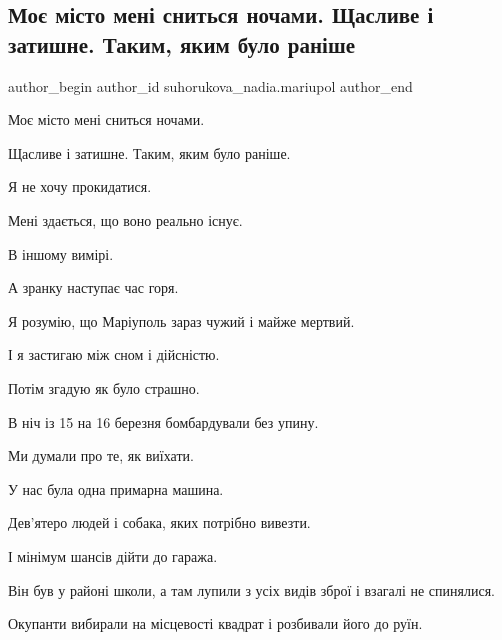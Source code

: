  
 
 
 
 

\subsection{Моє місто мені сниться ночами. Щасливе і затишне. Таким, яким  було раніше}
\label{sec:05_02_2023.fb.suhorukova_nadia.mariupol.1.mo__m_sto_men__snits}

\ifcmt
 author_begin
   author_id suhorukova_nadia.mariupol
 author_end
\fi

Моє місто мені сниться ночами.

Щасливе і затишне. Таким, яким  було раніше. 

Я не хочу прокидатися. 

Мені здається, що воно реально існує. 

В  іншому вимірі. 

А зранку наступає час горя. 

Я розумію, що Маріуполь зараз чужий і майже мертвий. 

І  я застигаю між сном і дійсністю. 

Потім  згадую як було страшно. 

В ніч із 15 на 16 березня бомбардували без упину. 

Ми думали про те, як виїхати.

У нас була одна примарна машина.

Дев'ятеро людей і собака, яких потрібно вивезти.

І мінімум шансів дійти до гаража.

Він був у районі школи, а там лупили з усіх видів зброї і взагалі не
спинялися. 

Окупанти вибирали на місцевості квадрат і розбивали його до руїн.

